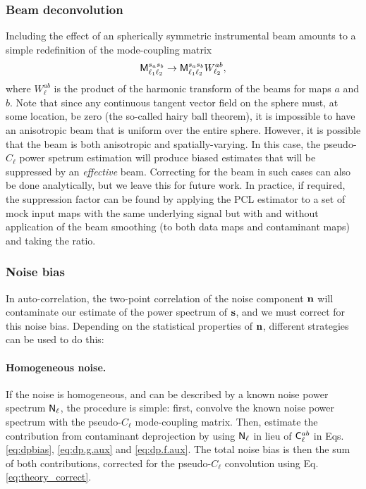 \documentclass[usenatbib]{mnrasb}
\begin{document}
        \subsubsection{Beam deconvolution}\label{sssec:maths.beam_noise.beam}
          Including the effect of an spherically symmetric instrumental beam amounts to a simple redefinition of the mode-coupling matrix
          \begin{equation}
            {\sf M}^{s_as_b}_{\ell_1\ell_2}\rightarrow{\sf M}^{s_as_b}_{\ell_1\ell_2}W_{\ell_2}^{ab},
          \end{equation}
          where $W^{ab}_\ell$ is the product of the harmonic transform of the beams for maps $a$ and $b$. Note that since any continuous tangent vector field on the sphere must, at some location, be zero (the so-called hairy ball theorem), it is impossible to have an anisotropic beam that is uniform over the entire sphere.  However, it is possible that the beam is both anisotropic and spatially-varying. In this case, the pseudo-$C_\ell$ power spetrum estimation will produce biased estimates that will be suppressed by an \emph{effective} beam. Correcting for the beam in such cases can also be done analytically, but we leave this for future work.  In practice, if required, the
          suppression factor can be found by applying the PCL estimator to a set of mock input maps with the same underlying signal but  with and without application of the beam smoothing (to both data maps and contaminant maps) and taking the ratio.

        \subsubsection{Noise bias}
         In auto-correlation, the two-point correlation of the noise component ${\bf n}$ will contaminate our estimate of the power spectrum of ${\bf s}$, and we must correct for this noise bias. Depending on the statistical properties of ${\bf n}$, different strategies can be used to do this:
         \paragraph*{Homogeneous noise.}
           If the noise is homogeneous, and can be described by a known noise power spectrum ${\sf N}_\ell$, the procedure is simple: first, convolve the known noise power spectrum with the pseudo-$C_\ell$ mode-coupling matrix. Then, estimate the contribution from contaminant deprojection by using ${\sf N}_\ell$ in lieu of ${\sf C}^{ab}_\ell$ in Eqs. \ref{eq:dpbias}, \ref{eq:dp.g.aux} and \ref{eq:dp.f.aux}. The total noise bias is then the sum of both contributions, corrected for the pseudo-$C_\ell$ convolution using Eq. \ref{eq:theory_correct}.
          
\end{document}
